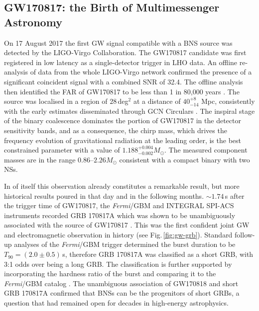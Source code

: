 \documentclass[binding=0.6cm, LaM]{sapthesis}
\begin{document}
\subsection{GW170817: the Birth of Multimessenger Astronomy}
\label{subsec:GW170817}
	On 17 August 2017 the first GW signal compatible with a BNS source 
	was detected by the LIGO-Virgo Collaboration.
	The GW170817 candidate was first registered in low latency \cite{112,114}
	as a single-detector trigger in LHO data. 
	An offline re-analysis \cite{28,111} of data from the whole LIGO-Virgo network 
	confirmed the presence of a significant coincident signal with a combined SNR of 32.4.
	The offline analysis then identified the FAR of GW170817 to be less than 1 in 80,000 years \cite{61}. 
	The source was localised \cite{59,152} in a region of $28\,$deg$^2$ at a distance of $40^{+8}_{-14}$ Mpc, 
	consistently with the early estimates disseminated through GCN Circulars \cite{55,60}.
	The inspiral stage of the binary coalescence dominates 
	the portion of GW170817 in the detector sensitivity bands, 
	and as a consequence, the chirp mass, 
	which drives the frequency evolution of gravitational radiation at the leading order, 
	is the best constrained parameter with a value of $1.188^{+0.004}_{-0.002}M_\odot$.
	The measured component masses are in the range $0.86$--$2.26M_\odot$
	consistent with a compact binary with two NSs.

        In of itself this observation already constitutes a remarkable result, 
	but more historical results poured in that day and in the following months.
	$\sim1.74$\,s after the trigger time of GW170817, the {\it Fermi}/GBM and INTEGRAL SPI-ACS instruments 
	recorded GRB 170817A \cite{147} which was shown to be unambiguously associated 
	with the source of GW170817 \cite{55}.
	This was the first confident joint GW and electromagnetic observation in history (see Fig.\,\ref{fig:gw-grb}).
	Standard follow-up analyses \cite{108,110} of the {\it Fermi}/GBM trigger 
	determined the burst duration to be $T_{90} = (2.0 \pm 0.5)\,$s,
	therefore GRB 170817A was classified as a short GRB, with 3:1 odds over being a long GRB.
        The classification is further supported by incorporating 
	the hardness ratio of the burst and comparing it to the {\it Fermi}/GBM catalog \cite{110}.
	The unambiguous association of GW170818 and short GRB 170817A confirmed that BNSs 
	can be the progenitors of short GRBs, a question that had remained open for decades in high-energy astrophysics.
\end{document}
